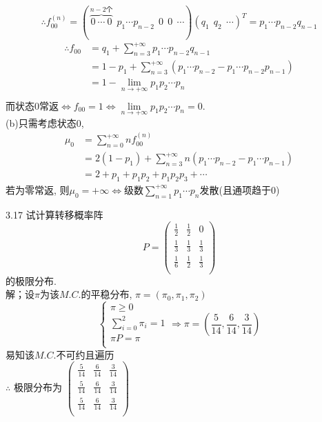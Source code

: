 \[
\therefore f^{(n)}_{00} = (\,\overbrace{0~\cdots~0}^{n-2\text{个}}~~p_1\cdots p_{n-2}~~0~~0~~\cdots)(q_1~~q_2~~\cdots)^T = p_1\cdots p_{n-2}q_{n-1}
\]
\[
\begin{split}
\therefore f_{00} & = q_1 + \sum^{+\infty}_{n=3}p_1\cdots p_{n-2}q_{n-1}\\
				& = 1 - p_1 + \sum^{+\infty}_{n=3}(p_1\cdots p_{n-2} - p_1\cdots p_{n-2}p_{n-1})\\
				& = 1 - \lim_{n\rightarrow +\infty}p_1p_2\cdots p_n\\
\end{split}
\]
而状态$0$常返$\Leftrightarrow f_{00} = 1 \Leftrightarrow \lim\limits_{n\rightarrow +\infty}p_1p_2\cdots p_n = 0$.\\
(b)只需考虑状态$0$, 
\[
\begin{split}
\mu_0 & = \sum^{+\infty}_{n=0}nf^{(n)}_{00}\\
	& = 2(1-p_1)+\sum^{+\infty}_{n=3}n(p_1\cdots p_{n-2} - p_1\cdots p_{n-1})\\
	& = 2 + p_1 + p_1p_2 + p_1p_2p_3 + \cdots
\end{split}
\]
若为零常返, 则$\mu_0 = +\infty \Leftrightarrow $级数$\sum\limits^{+\infty}_{n=1}p_1\cdots p_n$发散(且通项趋于$0$)


3.17 试计算转移概率阵
\[
P =
\begin{pmatrix}
	\frac{1}{2} & \frac{1}{2} & 0\\
	\frac{1}{3} & \frac{1}{3} & \frac{1}{3}\\
	\frac{1}{6} & \frac{1}{2} & \frac{1}{3}\\
\end{pmatrix}
\]
的极限分布.\\
解；设$\pi$为该$M.C.$的平稳分布, $\pi = (\pi_0, \pi_1, \pi_2)$\\
\[
\begin{cases}
\pi \geqslant 0\\
\sum\limits^2_{i=0} \pi_i = 1\\
\pi P = \pi\\
\end{cases}
\Rightarrow
\pi = (\frac{5}{14}, \frac{6}{14}, \frac{3}{14})
\]
易知该$M.C.$不可约且遍历\\
$\therefore$ 极限分布为
$
\begin{pmatrix}
	\frac{5}{14} & \frac{6}{14} & \frac{3}{14}\\
	\frac{5}{14} & \frac{6}{14} & \frac{3}{14}\\
	\frac{5}{14} & \frac{6}{14} & \frac{3}{14}\\
\end{pmatrix}
$


